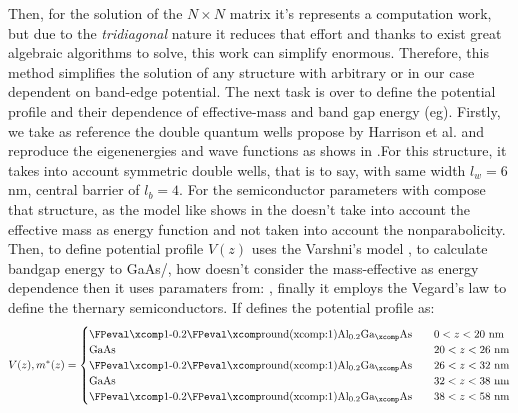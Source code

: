 Then, for the solution of the $N\times N$ matrix it's represents a computation work, but due to the \emph{tridiagonal} nature it reduces that effort and thanks to exist great algebraic algorithms to solve\cite{laug1999lapack,harris2020array}, this work can simplify enormous. 
Therefore, this method simplifies the solution of any structure with arbitrary or in our case dependent on band-edge potential. The next task is over to define the potential profile and their dependence of  effective-mass and band gap energy (\gls{eg}).  Firstly, we take as reference the double quantum wells propose by Harrison et al.\cite{harrison2016chap3} and reproduce the  eigenenergies and wave functions as shows in .For this structure, it takes into account symmetric double wells, that is to say, with same width $l_{w}=6$nm,  central barrier of $l_{b}=4$.  For the semiconductor parameters with compose that structure, as the model like shows in the  doesn't take into account the effective mass as energy function and not taken into account the nonparabolicity\cite{nelson1987band,cooper2010finite}. Then, to define potential profile $V(z)$ uses the Varshni's model \cite{varshni1967temperature}, to calculate bandgap energy to GaAs/\algaas, how doesn't consider the mass-effective as energy dependence then it uses paramaters from: \cite{vurgaftman2001bandparameters,molenk1988determination,adachi2009properties,lew2009heterostructuresbasicformalism}, finally it employs the Vegard's law to define the thernary semiconductors\cite{donmez2012study,zhou2001deviation}. If defines the potential profile as:
\begin{equation}\label{eqn:chapter-2-sec-numerical-calculations-harrison-potential-profile}
	V(z),m^{*}(z)=\begin{cases}
		\text{\algaasx{0.2}}\quad &0<z<20\text{ nm}\\
		\text{GaAs}\quad    &20<z<26\text{ nm}\\
		\text{\algaasx{0.2}}\quad &26<z<32\text{ nm}\\
		\text{GaAs}\quad    &32<z<38\text{ nm}\\
		\text{\algaasx{0.2}}\quad &38<z<58\text{ nm}
	\end{cases}
\end{equation}

